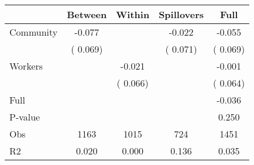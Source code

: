 
\begin{tabular}{l*{4}{c}}\hline&\multicolumn{1}{c}{Between}&\multicolumn{1}{c}{Within}&\multicolumn{1}{c}{Spillovers}&\multicolumn{1}{c}{Full}\\ \hline
 Community             &             -0.077      &                                               &       -0.022 &        -0.055                            \\ 
                               &        (       0.069)           &                                       &       (       0.071)     &      (       0.069)                                           \\ 
 Workers       &                                               &       -0.021    &                                &            -0.001                            \\ 
                               &                                               & (       0.066)                  &                                        &      (       0.064)                                           \\ 
\hline                                                                                                                                                                                                                                            
 Full                  &                                               &                                               &                                        &            -0.036                                     \\ 
 P-value               &                                               &                                               &                                        &             0.250                                           \\ 
 Obs                   &               1163               &       1015                       &       724                &              1451                                               \\ 
 R2                    &                      0.020              &              0.000                      &              0.136               &                     0.035                                              \\ 
\hline \end{tabular}                                                                                                                                                                                                              